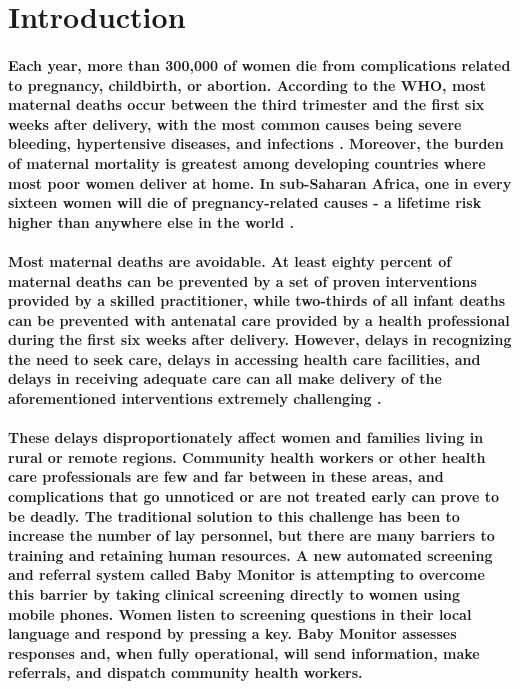 \section{Introduction}
\paragraph{Each year, more than 300,000 of women die from complications related to pregnancy, childbirth, or abortion. According to the WHO, most maternal deaths occur between the third trimester and the first six weeks after delivery, with the most common causes being severe bleeding, hypertensive diseases, and infections \citep{WHO2012}. Moreover, the burden of maternal mortality is greatest among developing countries where most poor women deliver at home. In sub-Saharan Africa, one in every sixteen women will die of pregnancy-related causes - a lifetime risk higher than anywhere else in the world \citep{Ronsmans2006}.}

\paragraph{Most maternal deaths are avoidable. At least eighty percent of maternal deaths can be prevented by a set of proven interventions provided by a skilled practitioner, while two-thirds of all infant deaths can be prevented with antenatal care provided by a health professional during the first six weeks after delivery. However, delays in recognizing the need to seek care, delays in accessing  health care facilities, and delays in receiving adequate care can all make delivery of the aforementioned interventions extremely challenging \citep{Thaddeus1994}.}

\paragraph{These delays disproportionately affect women and families living in rural or remote regions. Community health workers or other health care professionals are few and far between in these areas, and complications that go unnoticed or are not treated early can prove to be deadly. The traditional solution to this challenge has been to increase the number of lay personnel, but there are many barriers to training and retaining human resources. A new automated screening and referral system called Baby Monitor is attempting to overcome this barrier by taking clinical screening directly to women using mobile phones. Women listen to screening questions in their local language and respond by pressing a key. Baby Monitor assesses responses and, when fully operational, will send information, make referrals, and dispatch community health workers.}

